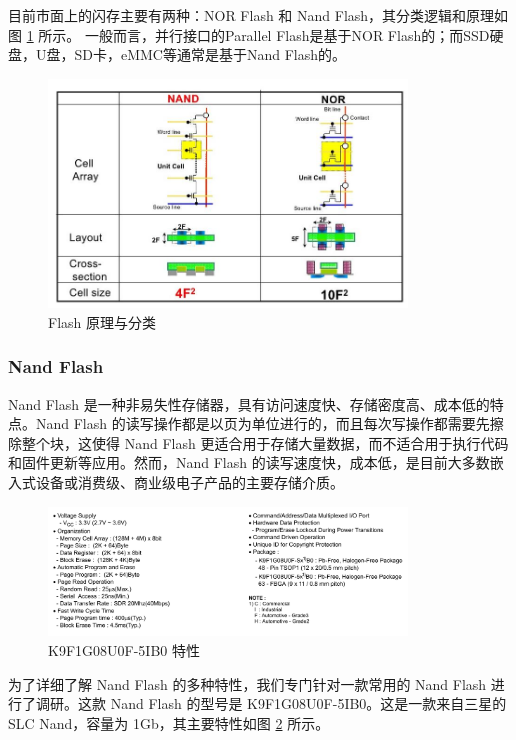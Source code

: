 目前市面上的闪存主要有两种：NOR Flash 和 Nand Flash，其分类逻辑和原理如图 \ref {flash-nand-nor} 所示。
一般而言，并行接口的Parallel Flash是基于NOR Flash的；而SSD硬盘，U盘，SD卡，eMMC等通常是基于Nand Flash的。

\begin{figure}[htbp]
  \centering
  \includegraphics[width=0.85\textwidth]{fig/flash-nand-nor}
  \caption{Flash 原理与分类}
  \label{flash-nand-nor}
\end{figure}

\subsubsection{Nand Flash}

Nand Flash 是一种非易失性存储器，具有访问速度快、存储密度高、成本低的特点。Nand Flash 的读写操作都是以页为单位进行的，而且每次写操作都需要先擦除整个块，这使得 Nand Flash 更适合用于存储大量数据，而不适合用于执行代码和固件更新等应用。然而，Nand Flash 的读写速度快，成本低，是目前大多数嵌入式设备或消费级、商业级电子产品的主要存储介质。

\begin{figure}[htbp]
  \centering
  \includegraphics[width=0.85\textwidth]{fig/flash-nand-feature}
  \caption{K9F1G08U0F-5IB0 特性}
  \label{flash-nand-feature}
\end{figure}

为了详细了解 Nand Flash 的多种特性，我们专门针对一款常用的 Nand Flash 进行了调研。这款 Nand Flash 的型号是 K9F1G08U0F-5IB0。这是一款来自三星的 SLC Nand，容量为 1Gb，其主要特性如图 \ref{flash-nand-feature} 所示。

